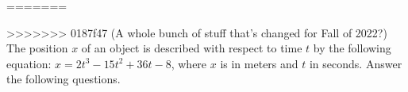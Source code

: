 \documentclass{../../oss-apphys-exam}
\newcounter{lastmc}
\begin{document}
\genfreedirections

\begin{questions}
=======
%

\begin{questions}
  \setcounter{question}{\value{lastmc}}
  
>>>>>>> 0187f47 (A whole bunch of stuff that's changed for Fall of 2022?)
  \question The position $x$ of an object is described with respect to time $t$
  by the following equation: $x=2t^3-15t^2+36t-8$, where $x$ is in meters and
  $t$ in seconds. Answer the following questions.
\end{questions}
\end{questions}
\end{document}
